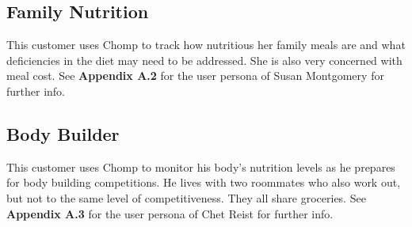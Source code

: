 \documentclass[a4paper,12pt]{article}
\begin{document}
\subsection{Family Nutrition}
This customer uses Chomp to track how nutritious her family meals are and what deficiencies in the diet may need to be addressed.  She is also very concerned with meal cost.  See \textbf{Appendix A.2} for the user persona of Susan Montgomery for further info.
\subsection{Body Builder}
This customer uses Chomp to monitor his body's nutrition levels as he prepares for body building competitions.  He lives with two roommates who also work out, but not to the same level of competitiveness.  They all share groceries.  See \textbf{Appendix A.3} for the user persona of Chet Reist for further info.
\end{document}

